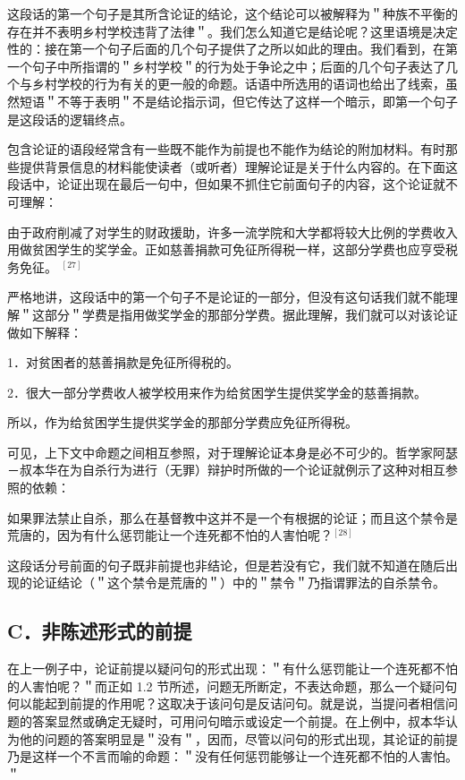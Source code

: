 这段话的第一个句子是其所含论证的结论，这个结论可以被解释为＂种族不平衡的存在并不表明乡村学校违背了法律＂。我们怎么知道它是结论呢？这里语境是决定性的：接在第一个句子后面的几个句子提供了之所以如此的理由。我们看到，在第一个句子中所指谓的＂乡村学校＂的行为处于争论之中；后面的几个句子表达了几个与乡村学校的行为有关的更一般的命题。话语中所选用的语词也给出了线索，虽然短语＂不等于表明＂不是结论指示词，但它传达了这样一个暗示，即第一个句子是这段话的逻辑终点。

包含论证的语段经常含有一些既不能作为前提也不能作为结论的附加材料。有时那些提供背景信息的材料能使读者（或听者）理解论证是关于什么内容的。在下面这段话中，论证出现在最后一句中，但如果不抓住它前面句子的内容，这个论证就不可理解：

由于政府削减了对学生的财政援助，许多一流学院和大学都将较大比例的学费收入用做贫困学生的奖学金。正如慈善捐款可免征所得税一样，这部分学费也应亨受税务免征。 ${ }^{[27]}$

严格地讲，这段话中的第一个句子不是论证的一部分，但没有这句话我们就不能理解＂这部分＂学费是指用做奖学金的那部分学费。据此理解，我们就可以对该论证做如下解释：

1．对贫困者的慈善捐款是免征所得税的。

2．很大一部分学费收人被学校用来作为给贫困学生提供奖学金的慈善捐款。

所以，作为给贫困学生提供奖学金的那部分学费应免征所得税。

可见，上下文中命题之间相互参照，对于理解论证本身是必不可少的。哲学家阿瑟－叔本华在为自杀行为进行（无罪）辩护时所做的一个论证就例示了这种对相互参照的依赖：

\begin{displayquote}
如果罪法禁止自杀，那么在基督教中这并不是一个有根据的论证；而且这个禁令是荒唐的，因为有什么惩罚能让一个连死都不怕的人害怕呢？${ }^{[28]}$
\end{displayquote}

这段话分号前面的句子既非前提也非结论，但是若没有它，我们就不知道在随后出现的论证结论（＂这个禁令是荒唐的＂）中的＂禁令＂乃指谓罪法的自杀禁令。

\subsection{C．非陈述形式的前提}
在上一例子中，论证前提以疑问句的形式出现：＂有什么惩罚能让一个连死都不怕的人害怕呢？＂而正如 1.2 节所述，问题无所断定，不表达命题，那么一个疑问句何以能起到前提的作用呢？这取决于该问句是反诘问句。就是说，当提问者相信问题的答案显然或确定无疑时，可用问句暗示或设定一个前提。在上例中，叔本华认为他的问题的答案明显是＂没有＂，因而，尽管以问句的形式出现，其论证的前提乃是这样一个不言而喻的命题：＂没有任何惩罚能够让一个连死都不怕的人害怕。＂

